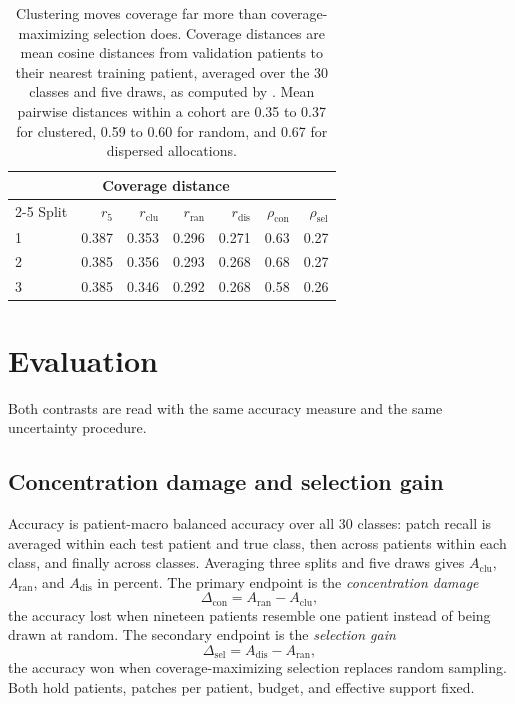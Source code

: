 \documentclass[11pt]{article}
\begin{document}
\begin{table}[htbp]
\centering
\renewcommand{\arraystretch}{1.15}
\begin{tabular}{@{}lrrrrrr@{}}
\toprule
 & \multicolumn{4}{c}{Coverage distance} & & \\
\cmidrule(lr){2-5}
Split & $r_{5}$ & $r_{\mathrm{clu}}$ & $r_{\mathrm{ran}}$ & $r_{\mathrm{dis}}$ & $\rho_{\mathrm{con}}$ & $\rho_{\mathrm{sel}}$ \\
\midrule
1 & 0.387 & 0.353 & 0.296 & 0.271 & 0.63 & 0.27 \\
2 & 0.385 & 0.356 & 0.293 & 0.268 & 0.68 & 0.27 \\
3 & 0.385 & 0.346 & 0.292 & 0.268 & 0.58 & 0.26 \\
\bottomrule
\end{tabular}
\caption{Clustering moves coverage far more than coverage-maximizing selection does. Coverage distances are mean cosine distances from validation patients to their nearest training patient, averaged over the 30 classes and five draws, as computed by \citet{queisler2026concentratedCoverage}. Mean pairwise distances within a cohort are 0.35 to 0.37 for clustered, 0.59 to 0.60 for random, and 0.67 for dispersed allocations.}
\label{tab:preview}
\end{table}

\section{Evaluation}
\label{sec:evaluation}
Both contrasts are read with the same accuracy measure and the same uncertainty procedure.

\subsection{Concentration damage and selection gain}
\label{sec:contrasts}
Accuracy is patient-macro balanced accuracy over all 30 classes: patch recall is averaged within each test patient and true class, then across patients within each class, and finally across classes. Averaging three splits and five draws gives $A_{\mathrm{clu}}$, $A_{\mathrm{ran}}$, and $A_{\mathrm{dis}}$ in percent. The primary endpoint is the \emph{concentration damage}
\begin{equation}
 \Delta_{\mathrm{con}}=A_{\mathrm{ran}}-A_{\mathrm{clu}},
 \label{eq:damage}
\end{equation}
\noindent the accuracy lost when nineteen patients resemble one patient instead of being drawn at random. The secondary endpoint is the \emph{selection gain}
\begin{equation}
 \Delta_{\mathrm{sel}}=A_{\mathrm{dis}}-A_{\mathrm{ran}},
 \label{eq:gain}
\end{equation}
\noindent the accuracy won when coverage-maximizing selection replaces random sampling. Both hold patients, patches per patient, budget, and effective support fixed.
\end{document}
